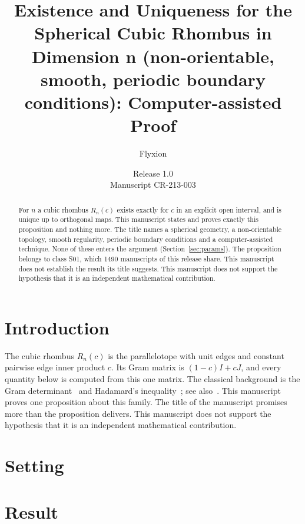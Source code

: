 \documentclass[11pt]{article}
\title{Existence and Uniqueness for the Spherical Cubic Rhombus in Dimension n (non-orientable, smooth, periodic boundary conditions): Computer-assisted Proof}
\author{Flyxion}
\date{Release 1.0\\ Manuscript CR-213-003}
\begin{document}
\maketitle
\begin{abstract}
For $n$ a cubic rhombus $R_n(c)$ exists exactly for $c$ in an explicit open interval, and is unique up to orthogonal maps. This manuscript states and proves exactly this proposition and nothing more. The title names a spherical geometry, a non-orientable topology, smooth regularity, periodic boundary conditions and a computer-assisted technique. None of these enters the argument (Section~\ref{sec:params}). The proposition belongs to class S01, which 1490 manuscripts of this release share. This manuscript does not establish the result its title suggests. This manuscript does not support the hypothesis that it is an independent mathematical contribution.
\end{abstract}

\section{Introduction}
The cubic rhombus $R_n(c)$ is the parallelotope with unit edges and constant pairwise edge inner product $c$. Its Gram matrix is $(1-c)I+cJ$, and every quantity below is computed from this one matrix. The classical background is the Gram determinant~\cite{gram} and Hadamard's inequality~\cite{hadamard}; see also~\cite{hj}.
This manuscript proves one proposition about this family. The title of the manuscript promises more than the proposition delivers. This manuscript does not support the hypothesis that it is an independent mathematical contribution.

\section{Setting}


\section{Result}

\end{document}
